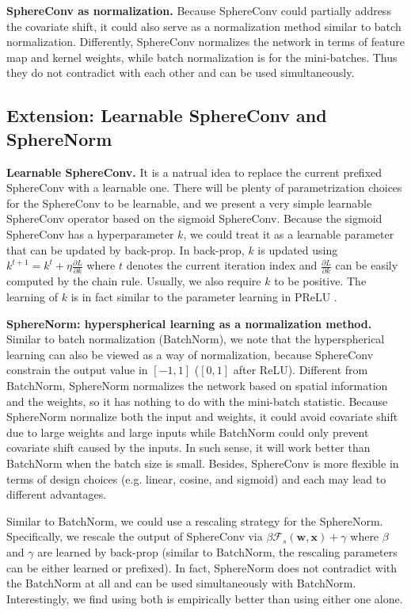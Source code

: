 \textbf{SphereConv as normalization.} Because SphereConv could partially address the covariate shift, it could also serve as a normalization method similar to batch normalization. Differently, SphereConv normalizes the network in terms of feature map and kernel weights, while batch normalization is for the mini-batches. Thus they do not contradict with each other and can be used simultaneously.

\subsection{Extension: Learnable SphereConv and SphereNorm}

\textbf{Learnable SphereConv.} It is a natrual idea to replace the current prefixed SphereConv with a learnable one. There will be plenty of parametrization choices for the SphereConv to be learnable, and we present a very simple learnable SphereConv operator based on the sigmoid SphereConv. Because the sigmoid SphereConv has a hyperparameter $k$, we could treat it as a learnable parameter that can be updated by back-prop. In back-prop, $k$ is updated using $k^{t+1}=k^{t} +\eta\frac{\partial L}{\partial k}$ where $t$ denotes the current iteration index and $\frac{\partial L}{\partial k}$ can be easily computed by the chain rule. Usually, we also require $k$ to be positive. The learning of $k$ is in fact similar to the parameter learning in PReLU \cite{he2015delving}.
\par

\textbf{SphereNorm: hyperspherical learning as a normalization method.} Similar to batch normalization (BatchNorm), we note that the hyperspherical learning can also be viewed as a way of normalization, because SphereConv constrain the output value in $[-1,1]$ ($[0,1]$ after ReLU). Different from BatchNorm, SphereNorm normalizes the network based on spatial information and the weights, so it has nothing to do with the mini-batch statistic. Because SphereNorm normalize both the input and weights, it could avoid covariate shift due to large weights and large inputs while BatchNorm could only prevent covariate shift caused by the inputs. In such sense, it will work better than BatchNorm when the batch size is small. Besides, SphereConv is more flexible in terms of design choices (e.g. linear, cosine, and sigmoid) and each may lead to different advantages.
\par
Similar to BatchNorm, we could use a rescaling strategy for the SphereNorm. Specifically, we rescale the output of SphereConv via $\beta\mathcal{F}_s(\bm{w},\bm{x})+\gamma$ where $\beta$ and $\gamma$ are learned by back-prop (similar to BatchNorm, the rescaling parameters can be either learned or prefixed). In fact, SphereNorm does not contradict with the BatchNorm at all and can be used simultaneously with BatchNorm. Interestingly, we find using both is empirically better than using either one alone.

